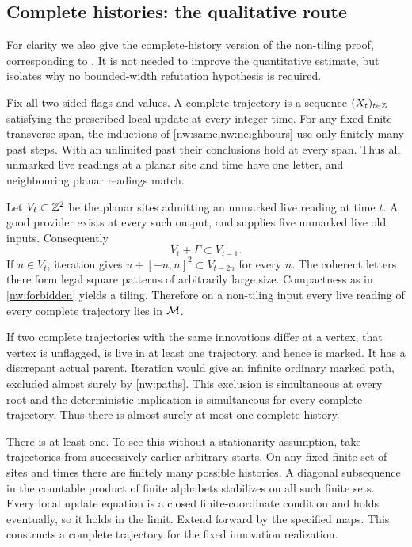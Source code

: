 \subsection{Complete histories: the qualitative route}

For clarity we also give the complete-history version of the non-tiling proof, corresponding to \cite[Lemmas~5.3 and~8.5]{DMdiagram}. It is not needed to improve the quantitative estimate, but isolates why no bounded-width refutation hypothesis is required.

Fix all two-sided flags and values. A complete trajectory is a sequence $(X_t)_{t\in\mathbb{Z}}$ satisfying the prescribed local update at every integer time. For any fixed finite transverse span, the inductions of \cref{nw:same,nw:neighbours} use only finitely many past steps. With an unlimited past their conclusions hold at every span. Thus all unmarked live readings at a planar site and time have one letter, and neighbouring planar readings match.

Let $V_t\subset\mathbb{Z}^2$ be the planar sites admitting an unmarked live reading at time $t$. A good provider exists at every such output, and supplies five unmarked live old inputs. Consequently
\[
 V_t+\Gamma\subset V_{t-1}.
\]
If $u\in V_t$, iteration gives $u+[-n,n]^2\subset V_{t-2n}$ for every $n$. The coherent letters there form legal square patterns of arbitrarily large size. Compactness as in \cref{nw:forbidden} yields a tiling. Therefore on a non-tiling input every live reading of every complete trajectory lies in $\mathcal M$.

If two complete trajectories with the same innovations differ at a vertex, that vertex is unflagged, is live in at least one trajectory, and hence is marked. It has a discrepant actual parent. Iteration would give an infinite ordinary marked path, excluded almost surely by \cref{nw:paths}. This exclusion is simultaneous at every root and the deterministic implication is simultaneous for every complete trajectory. Thus there is almost surely at most one complete history.

There is at least one. To see this without a stationarity assumption, take trajectories from successively earlier arbitrary starts. On any fixed finite set of sites and times there are finitely many possible histories. A diagonal subsequence in the countable product of finite alphabets stabilizes on all such finite sets. Every local update equation is a closed finite-coordinate condition and holds eventually, so it holds in the limit. Extend forward by the specified maps. This constructs a complete trajectory for the fixed innovation realization.

